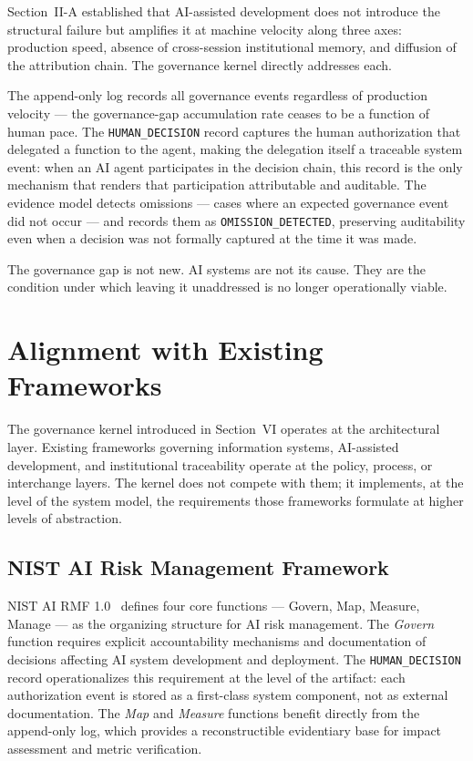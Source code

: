\documentclass[conference]{IEEEtran}
\begin{document}
Section~II-A established that AI-assisted development does not introduce the structural failure but amplifies it at machine velocity along three axes: production speed, absence of cross-session institutional memory, and diffusion of the attribution chain. The governance kernel directly addresses each.

The append-only log records all governance events regardless of production velocity --- the governance-gap accumulation rate ceases to be a function of human pace. The \texttt{HUMAN\_DECISION} record captures the human authorization that delegated a function to the agent, making the delegation itself a traceable system event: when an AI agent participates in the decision chain, this record is the only mechanism that renders that participation attributable and auditable. The evidence model detects omissions --- cases where an expected governance event did not occur --- and records them as \texttt{OMISSION\_DETECTED}, preserving auditability even when a decision was not formally captured at the time it was made.

The governance gap is not new. AI systems are not its cause. They are the condition under which leaving it unaddressed is no longer operationally viable.

\section{Alignment with Existing Frameworks}

The governance kernel introduced in Section~VI operates at the architectural layer. Existing frameworks governing information systems, AI-assisted development, and institutional traceability operate at the policy, process, or interchange layers. The kernel does not compete with them; it implements, at the level of the system model, the requirements those frameworks formulate at higher levels of abstraction.

\subsection{NIST AI Risk Management Framework}

NIST AI RMF 1.0~\cite{nist2023} defines four core functions --- Govern, Map, Measure, Manage --- as the organizing structure for AI risk management. The \emph{Govern} function requires explicit accountability mechanisms and documentation of decisions affecting AI system development and deployment. The \texttt{HUMAN\_DECISION} record operationalizes this requirement at the level of the artifact: each authorization event is stored as a first-class system component, not as external documentation. The \emph{Map} and \emph{Measure} functions benefit directly from the append-only log, which provides a reconstructible evidentiary base for impact assessment and metric verification.
\end{document}
